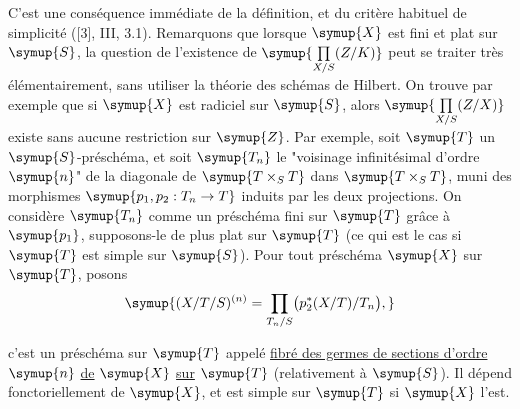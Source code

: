 C'est une conséquence immédiate de la définition, et du critère habituel de
simplicité ([3], III, 3.1). Remarquons que lorsque $\symup{X}$ est fini et plat sur
$\symup{S}$, la question de l'existence de $\symup{\prod\limits_{X/S}(Z/K)}$ peut se traiter très élémentairement, sans
utiliser la théorie des schémas de Hilbert. On trouve par exemple que si $\symup{X}$
est radiciel sur $\symup{S}$, alors $\symup{\prod\limits_{X/S}(Z/X)}$ existe sans aucune restriction sur
$\symup{Z}$. Par exemple, soit $\symup{T}$ un $\symup{S}$-préschéma, et soit $\symup{T_n}$ le "voisinage
infinitésimal d'ordre $\symup{n}$" de la diagonale de $\symup{T\times_ST}$ dans $\symup{T\times_ST}$,
muni des morphismes $\symup{p_1,p_2:T_n\to T}$ induits par les deux
projections. On considère $\symup{T_n}$ comme un préschéma fini sur $\symup{T}$ grâce à $\symup{p_1}$,
supposons-le de plus plat sur $\symup{T}$ (ce qui est le cas si $\symup{T}$ est simple sur $\symup{S}$).
Pour tout préschéma $\symup{X}$ sur $\symup{T}$, posons
\[
\symup{(X/T/S)^{(n)}=
\prod\limits_{T_n/S}\bigl(p_2^*(X/T)/T_n\bigr),}
\]

c'est un préschéma sur $\symup{T}$ appelé \uline{fibré des germes de sections d'ordre}
$\symup{n}$ \uline{de} $\symup{X}$ \uline{sur} $\symup{T}$ (relativement à $\symup{S}$). Il dépend fonctoriellement de $\symup{X}$, et
est simple sur $\symup{T}$ si $\symup{X}$ l'est.


